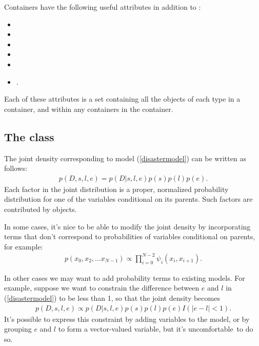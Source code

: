 \documentclass[]{jss}
\begin{document}
Containers have the following useful attributes in addition to :
\begin{itemize}
    \item{}
    \item{}
    \item{}
    \item{}
    \item{}
    \item{}.
\end{itemize}
Each of these attributes is a set containing all the objects of each type in a container, and within any containers in the container.



\subsection[The Potential class]{The  class} \label{potential}



The joint density corresponding to model (\ref{disastermodel}) can be written as follows:
\begin{eqnarray*}
    p(D,s,l,e) = p(D|s,l,e) p(s) p(l) p(e).
\end{eqnarray*}
Each factor in the joint distribution is a proper, normalized probability distribution for one of the variables conditional on its parents. Such factors are contributed by  objects.

In some cases, it's nice to be able to modify the joint density by incorporating terms that don't correspond to probabilities of variables conditional on parents, for example:
\begin{eqnarray*}
    p(x_0, x_2, \ldots x_{N-1}) \propto \prod_{i=0}^{N-2} \psi_i(x_i, x_{i+1}).
\end{eqnarray*}


In other cases we may want to add probability terms to existing models. For example, suppose we want to constrain the difference between $e$ and $l$ in (\ref{disastermodel}) to be less than 1, so that the joint density becomes
\begin{eqnarray*}
    p(D,s,l,e) \propto p(D|s,l,e) p(s) p(l) p(e) I(|e-l|<1).
\end{eqnarray*}
It's possible to express this constraint by adding variables to the model, or by grouping $e$ and $l$ to form a vector-valued variable, but it's uncomfortable~to do so.
\end{document}
